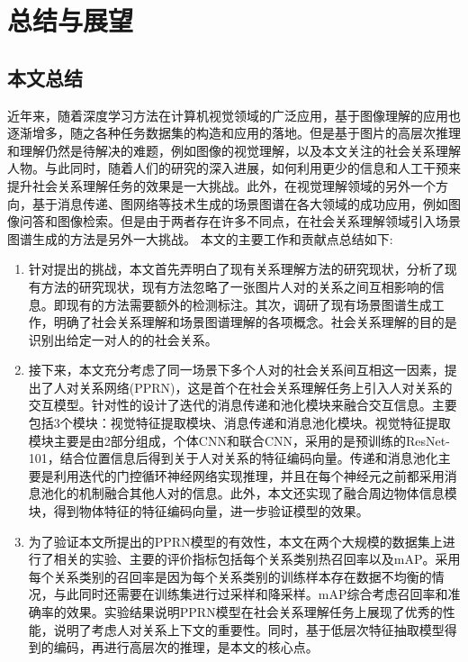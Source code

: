 
\chapter{总结与展望}
\label{ch:conclusion}

\section{本文总结}

近年来，随着深度学习方法在计算机视觉领域的广泛应用，基于图像理解的应用也逐渐增多，随之各种任务数据集的构造和应用的落地。但是基于图片的高层次推理和理解仍然是待解决的难题，例如图像的视觉理解，以及本文关注的社会关系理解人物。与此同时，随着人们的研究的深入进展，如何利用更少的信息和人工干预来提升社会关系理解任务的效果是一大挑战。此外，在视觉理解领域的另外一个方向，基于消息传递、图网络等技术生成的场景图谱在各大领域的成功应用，例如图像问答和图像检索。但是由于两者存在许多不同点，在社会关系理解领域引入场景图谱生成的方法是另外一大挑战。
本文的主要工作和贡献点总结如下:
\begin{enumerate}
    \item 针对提出的挑战，本文首先弄明白了现有关系理解方法的研究现状，分析了现有方法的研究现状，现有方法忽略了一张图片人对的关系之间互相影响的信息。即现有的方法需要额外的检测标注。其次，调研了现有场景图谱生成工作，明确了社会关系理解和场景图谱理解的各项概念。社会关系理解的目的是识别出给定一对人的的社会关系。
    \item 接下来，本文充分考虑了同一场景下多个人对的社会关系间互相这一因素，提出了人对关系网络(PPRN)，这是首个在社会关系理解任务上引入人对关系的交互模型。针对性的设计了迭代的消息传递和池化模块来融合交互信息。主要包括3个模块：视觉特征提取模块、消息传递和消息池化模块。视觉特征提取模块主要是由2部分组成，个体CNN和联合CNN，采用的是预训练的ResNet-101，结合位置信息后得到关于人对关系的特征编码向量。传递和消息池化主要是利用迭代的门控循环神经网络实现推理，并且在每个神经元之前都采用消息池化的机制融合其他人对的信息。此外，本文还实现了融合周边物体信息模块，得到物体特征的特征编码向量，进一步验证模型的效果。
    \item 为了验证本文所提出的PPRN模型的有效性，本文在两个大规模的数据集上进行了相关的实验、主要的评价指标包括每个关系类别热召回率以及mAP。采用每个关系类别的召回率是因为每个关系类别的训练样本存在数据不均衡的情况，与此同时还需要在训练集进行过采样和降采样。mAP综合考虑召回率和准确率的效果。实验结果说明PPRN模型在社会关系理解任务上展现了优秀的性能，说明了考虑人对关系上下文的重要性。同时，基于低层次特征抽取模型得到的编码，再进行高层次的推理，是本文的核心点。
\end{enumerate}

